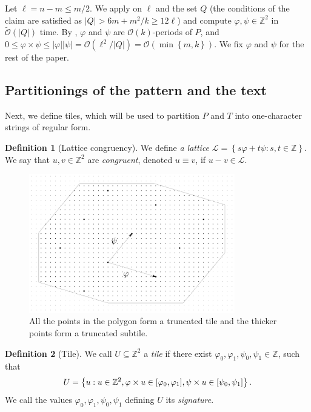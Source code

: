\documentclass[11pt, letterpaper]{article}
\theoremstyle{plain}
\theoremstyle{definition}
\newtheorem{definition}{Definition}
\theoremstyle{remark}
\newcommand{\Z}{\mathbb{Z}}
\renewcommand{\O}{\mathcal{O}}
\newcommand{\tO}{\tilde{\mathcal{O}}}
\renewcommand{\L}{\mathcal{L}}
\renewcommand{\phi}{\varphi}
\newcommand{\set}[1]{\left\lbrace #1 \right\rbrace}
\newcommand{\absolute}[1]{\left\lvert#1\right\rvert}
\begin{document}
Let $\ell = n - m \le m / 2$. We apply  on $\ell$ and the set $Q$ (the conditions of the claim are satisfied as $\absolute{Q} > 6m + m^2/k \ge 12\ell$) and compute $\phi, \psi \in \Z^2$ in $\tO(\absolute{Q})$ time. By , $\phi$ and $\psi$ are $\O(k)$-periods of $P$, and $0 \le \phi \times \psi \le \absolute{\phi}\absolute{\psi} = \O(\ell^2 / \absolute{Q}) =  \O(\min\set{m, k})$. We fix $\phi$ and $\psi$ for the rest of the paper.

\subsection{Partitionings of the pattern and the text}
\label{sec:partitioning}
Next, we define tiles, which will be used to partition $P$ and $T$ into one-character strings of regular form.

\begin{definition}[Lattice congruency]\label{lattice_congruency}
We define \emph{a lattice} $\L = \set{s\phi + t\psi : s, t \in \Z}$. We say that $u, v \in \Z^2$ are \emph{congruent}, denoted $u \equiv v$, if $u - v \in \L$. 
\end{definition}

\begin{figure}[h!]
	\begin{center}
		\includegraphics[width=0.8\textwidth]{drawings/parquet}
	\end{center}
	\caption{All the points in the polygon form a truncated tile and the thicker points form a truncated subtile.}
	\label{figure:tile}
\end{figure}

\begin{definition}[Tile]\label{tile_definition}
We call $U \subseteq \Z^2$ a \emph{tile} if there exist $\phi_0, \phi_1, \psi_0, \psi_1 \in \Z$, such that
	\[ U = \set{u : u \in \Z^2, \h{u} \in [\phi_0, \phi_1], \s{u} \in [\psi_0, \psi_1]}. \]
We call the values $\phi_0, \phi_1, \psi_0, \psi_1$ defining $U$ its \emph{signature}. 
\end{definition}
\end{document}
